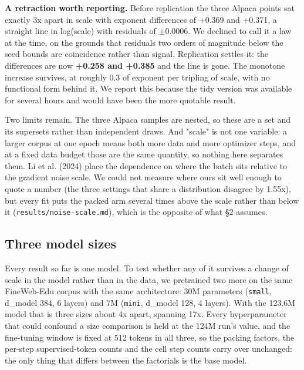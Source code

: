 \documentclass[11pt]{article}
\begin{document}
\textbf{A retraction worth reporting.} Before replication the three Alpaca points sat exactly 3x apart in scale with exponent differences of +0.369 and +0.371, a straight line in log(scale) with residuals of $\pm$0.0006. We declined to call it a law at the time, on the grounds that residuals two orders of magnitude below the seed bounds are coincidence rather than signal. Replication settles it: the differences are now \textbf{+0.258 and +0.385} and the line is gone. The monotone increase survives, at roughly 0.3 of exponent per tripling of scale, with no functional form behind it. We report this because the tidy version was available for several hours and would have been the more quotable result.

Two limits remain. The three Alpaca samples are nested, so these are a set and its supersets rather than independent draws. And "scale" is not one variable: a larger corpus at one epoch means both more data and more optimizer steps, and at a fixed data budget those are the same quantity, so nothing here separates them. Li et al. (2024) place the dependence on where the batch sits relative to the gradient noise scale. We could not measure where ours sit well enough to quote a number (the three settings that share a distribution disagree by 1.55x), but every fit puts the packed arm several times above the scale rather than below it (\texttt{results/\allowbreak{}noise-scale.md}), which is the opposite of what \S{}2 assumes.

\subsection{Three model sizes}

Every result so far is one model. To test whether any of it survives a change of scale in the model rather than in the data, we pretrained two more on the same FineWeb-Edu corpus with the same architecture: 30M parameters (\texttt{small}, d\_model 384, 6 layers) and 7M (\texttt{mini}, d\_model 128, 4 layers). With the 123.6M model that is three sizes about 4x apart, spanning 17x. Every hyperparameter that could confound a size comparison is held at the 124M run's value, and the fine-tuning window is fixed at 512 tokens in all three, so the packing factors, the per-step supervised-token counts and the cell step counts carry over unchanged: the only thing that differs between the factorials is the base model.
\end{document}
